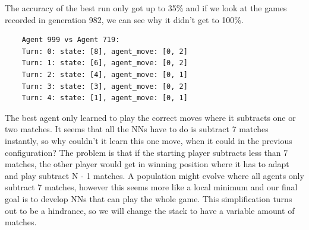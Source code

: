 \documentclass[11pt]{report}
\begin{document}
\begin{enumerate}
\begin{center}
    \end{center}
    The accuracy of the best run only got up to 35\% and if we look at the games recorded in generation 982, we can see why it didn't get to 100\%.
    \begin{verbatim}
    Agent 999 vs Agent 719:
    Turn: 0: state: [8], agent_move: [0, 2]
    Turn: 1: state: [6], agent_move: [0, 2]
    Turn: 2: state: [4], agent_move: [0, 1]
    Turn: 3: state: [3], agent_move: [0, 2]
    Turn: 4: state: [1], agent_move: [0, 1]
    \end{verbatim}
    The best agent only learned to play the correct moves where it subtracts one or two matches.
    It seems that all the NNs have to do is subtract 7 matches instantly, so why couldn't it learn this one move, when it could in the previous configuration?
    The problem is that if the starting player subtracts less than 7 matches, the other player would get in winning position where it has to adapt and play subtract N - 1 matches.
    A population might evolve where all agents only subtract 7 matches, however this seems more like a local minimum and our final goal is to develop NNs that can play the whole game.
    This simplification turns out to be a hindrance, so we will change the stack to have a variable amount of matches.

\end{enumerate}
\end{document}

